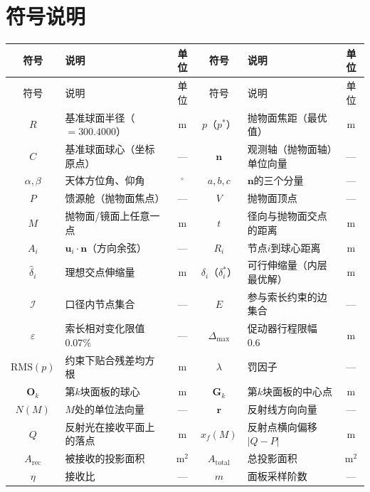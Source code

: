 \documentclass[withoutpreface]{cumcmthesis}
\begin{document}
\section{符号说明}

\begin{longtable}{c p{4.2cm} c | c p{4.2cm} c}
\toprule
符号 & 说明 & 单位 & 符号 & 说明 & 单位 \\
\midrule
\endfirsthead
\toprule
符号 & 说明 & 单位 & 符号 & 说明 & 单位 \\
\midrule
\endhead
\bottomrule
\endfoot
\bottomrule
\endlastfoot
$R$ & 基准球面半径（$=300.4000$） & $\mathrm{m}$ & $p$（$p^*$） & 抛物面焦距（最优值） & $\mathrm{m}$ \\
$C$ & 基准球面球心（坐标原点） & --- & $\mathbf{n}$ & 观测轴（抛物面轴）单位向量 & --- \\
$\alpha,\beta$ & 天体方位角、仰角 & $^{\circ}$ & $a,b,c$ & $\mathbf{n}$的三个分量 & --- \\
$P$ & 馈源舱（抛物面焦点） & --- & $V$ & 抛物面顶点 & --- \\
$M$ & 抛物面/镜面上任意一点 & $\mathrm{m}$ & $t$ & 径向与抛物面交点的距离 & $\mathrm{m}$ \\
$A_i$ & $\mathbf{u}_i\cdot\mathbf{n}$（方向余弦） & --- & $R_i$ & 节点$i$到球心距离 & $\mathrm{m}$ \\
$\hat{\delta}_i$ & 理想交点伸缩量 & $\mathrm{m}$ & $\delta_i$（$\delta_i^*$） & 可行伸缩量（内层最优解） & $\mathrm{m}$ \\
$\mathcal{I}$ & 口径内节点集合 & --- & $E$ & 参与索长约束的边集合 & --- \\
$\varepsilon$ & 索长相对变化限值 $0.07\%$ & --- & $\Delta_{\max}$ & 促动器行程限幅 $0.6$ & $\mathrm{m}$ \\
$\mathrm{RMS}(p)$ & 约束下贴合残差均方根 & $\mathrm{m}$ & $\lambda$ & 罚因子 & --- \\
$\mathbf{O}_k$ & 第$k$块面板的球心 & $\mathrm{m}$ & $\mathbf{G}_k$ & 第$k$块面板的中心点 & $\mathrm{m}$ \\
$N(M)$ & $M$处的单位法向量 & --- & $\mathbf{r}$ & 反射线方向向量 & --- \\
$Q$ & 反射光在接收平面上的落点 & $\mathrm{m}$ & $x_f(M)$ & 反射点横向偏移$|Q-P|$ & $\mathrm{m}$ \\
$A_{\mathrm{rec}}$ & 被接收的投影面积 & $\mathrm{m}^2$ & $A_{\mathrm{total}}$ & 总投影面积 & $\mathrm{m}^2$ \\
$\eta$ & 接收比 & --- & $m$ & 面板采样阶数 & --- \\
\bottomrule
\end{longtable}
\end{document}
